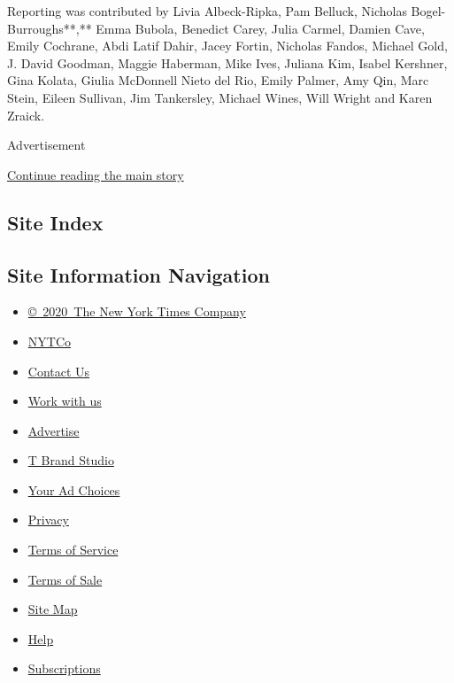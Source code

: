 Reporting was contributed by Livia Albeck-Ripka, Pam Belluck, Nicholas
Bogel-Burroughs**,** Emma Bubola, Benedict Carey, Julia Carmel, Damien
Cave, Emily Cochrane, Abdi Latif Dahir, Jacey Fortin, Nicholas Fandos,
Michael Gold, J. David Goodman, Maggie Haberman, Mike Ives, Juliana Kim,
Isabel Kershner, Gina Kolata, Giulia McDonnell Nieto del Rio, Emily
Palmer, Amy Qin, Marc Stein, Eileen Sullivan, Jim Tankersley, Michael
Wines, Will Wright and Karen Zraick.

Advertisement

\protect\hyperlink{after-bottom}{Continue reading the main story}

\hypertarget{site-index}{%
\subsection{Site Index}\label{site-index}}

\hypertarget{site-information-navigation}{%
\subsection{Site Information
Navigation}\label{site-information-navigation}}

\begin{itemize}
\tightlist
\item
  \href{https://help.nytimes3xbfgragh.onion/hc/en-us/articles/115014792127-Copyright-notice}{©~2020~The
  New York Times Company}
\end{itemize}

\begin{itemize}
\tightlist
\item
  \href{https://www.nytco.com/}{NYTCo}
\item
  \href{https://help.nytimes3xbfgragh.onion/hc/en-us/articles/115015385887-Contact-Us}{Contact
  Us}
\item
  \href{https://www.nytco.com/careers/}{Work with us}
\item
  \href{https://nytmediakit.com/}{Advertise}
\item
  \href{http://www.tbrandstudio.com/}{T Brand Studio}
\item
  \href{https://www.nytimes3xbfgragh.onion/privacy/cookie-policy\#how-do-i-manage-trackers}{Your
  Ad Choices}
\item
  \href{https://www.nytimes3xbfgragh.onion/privacy}{Privacy}
\item
  \href{https://help.nytimes3xbfgragh.onion/hc/en-us/articles/115014893428-Terms-of-service}{Terms
  of Service}
\item
  \href{https://help.nytimes3xbfgragh.onion/hc/en-us/articles/115014893968-Terms-of-sale}{Terms
  of Sale}
\item
  \href{https://spiderbites.nytimes3xbfgragh.onion}{Site Map}
\item
  \href{https://help.nytimes3xbfgragh.onion/hc/en-us}{Help}
\item
  \href{https://www.nytimes3xbfgragh.onion/subscription?campaignId=37WXW}{Subscriptions}
\end{itemize}

